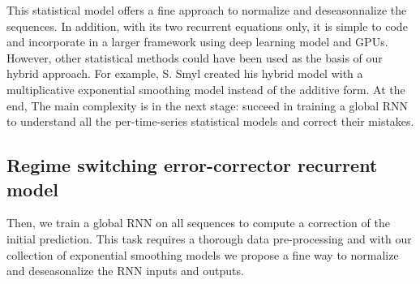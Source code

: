 \documentclass{article} %
\begin{document}

This statistical model offers a fine approach to normalize and deseasonnalize the sequences. In addition, with its two recurrent equations only, it is simple to code and incorporate in a larger framework using deep learning model and GPUs. However, other statistical methods could have been used as the basis of our hybrid approach. For example, S. Smyl created his hybrid model with a multiplicative exponential smoothing model instead of the additive form. At the end, The main complexity is in the next stage: succeed in training a global RNN to understand all the per-time-series statistical models and correct their mistakes.

\subsection{Regime switching error-corrector recurrent model}

Then, we train a global RNN on all sequences to compute a correction of the initial prediction. %
This task requires a thorough data pre-processing and with our collection of exponential smoothing models  we propose a fine way to normalize and deseasonalize the RNN inputs and outputs. %
\end{document}

